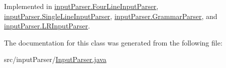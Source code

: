 Implemented in \hyperlink{classinput_parser_1_1_four_line_input_parser_a99c37488d66cfeecb33e13d573b4a81a}{input\-Parser.\-Four\-Line\-Input\-Parser}, \hyperlink{classinput_parser_1_1_single_line_input_parser_ad822676b0d3182a591e2004c3bcc79d5}{input\-Parser.\-Single\-Line\-Input\-Parser}, \hyperlink{classinput_parser_1_1_grammar_parser_a46c33fdad541b475abc31e44d56eb507}{input\-Parser.\-Grammar\-Parser}, and \hyperlink{classinput_parser_1_1_l_r_input_parser_ab1fb2966ece506eead96dcededca86a6}{input\-Parser.\-L\-R\-Input\-Parser}.



The documentation for this class was generated from the following file\-:\begin{DoxyCompactItemize}
\item 
src/input\-Parser/\hyperlink{_input_parser_8java}{Input\-Parser.\-java}\end{DoxyCompactItemize}
